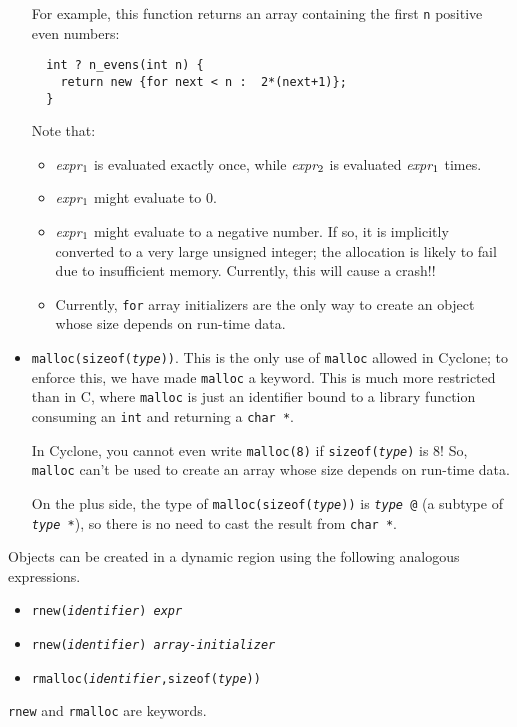 \begin{itemize}
  For example, this function returns an array containing the first
  \texttt{n} positive even numbers:
\begin{verbatim}
  int ? n_evens(int n) {
    return new {for next < n :  2*(next+1)};
  }
\end{verbatim}

  Note that:
  \begin{itemize}
  \item {\it expr}\(\sb{1}\) is evaluated exactly once, while {\it
      expr}\(\sb{2}\) is evaluated {\it expr}\(\sb{1}\) times.
  \item {\it expr}\(\sb{1}\) might evaluate to 0.
  \item {\it expr}\(\sb{1}\) might evaluate to a negative number.
    If so, it is implicitly converted to a very large unsigned
    integer; the allocation is likely to fail due to insufficient
    memory.  Currently, this will cause a crash!!
  \item Currently, \texttt{for} array initializers are the only way to
    create an object whose size depends on run-time data.
  \end{itemize}
  
\item \texttt{malloc(sizeof({\it type}))}.  This is the only use of
  \texttt{malloc} allowed in Cyclone; to enforce this, we have made
  \texttt{malloc} a keyword.  This is much more restricted
  than in C, where \texttt{malloc} is just an identifier bound to a
  library function consuming an \texttt{int} and returning a
  \texttt{char *}.

  In Cyclone, you cannot even write \texttt{malloc(8)} if
  \texttt{sizeof({\it type})} is 8!  So, \texttt{malloc} can't be used
  to create an array whose size depends on run-time data.
  
  On the plus side, the type of \texttt{malloc(sizeof({\it type}))} is
  \texttt{{\it type} @} (a subtype of \texttt{{\it type} *}),
  so there is no need to cast the result from \texttt{char *}.
\end{itemize}

Objects can be created in a dynamic region using the following analogous
expressions.
\begin{itemize}
\item \texttt{rnew({\it identifier}) {\it expr}}
\item \texttt{rnew({\it identifier}) {\it array-initializer}}
\item \texttt{rmalloc({\it identifier},sizeof({\it type}))}
\end{itemize}
\texttt{rnew} and \texttt{rmalloc} are keywords.


